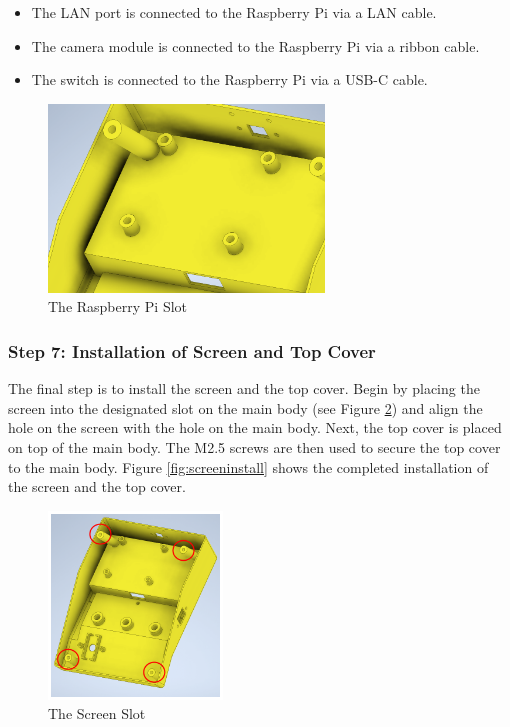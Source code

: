 \begin{itemize}
    \item The LAN port is connected to the Raspberry Pi via a LAN cable.
    \item The camera module is connected to the Raspberry Pi via a ribbon cable.
    \item The switch is connected to the Raspberry Pi via a USB-C cable.
\end{itemize}

\begin{figure}[!ht]
    \centering
    \includegraphics[height=5cm]{texs/Part1/chapter5/image/raspislot.png}
    \caption{The Raspberry Pi Slot}
    \label{fig:raspislot}
\end{figure}

\subsubsection{Step 7: Installation of Screen and Top Cover}

The final step is to install the screen and the top cover. Begin by placing the screen into the designated slot on the main body (see Figure \ref{fig:screenslot}) and align the hole on the screen with the hole on the main body. Next, the top cover is placed on top of the main body. The M2.5 screws are then used to secure the top cover to the main body. Figure \ref{fig:screeninstall} shows the completed installation of the screen and the top cover.

\begin{figure}[!ht]
    \centering
    \includegraphics[height=5cm]{texs/Part1/chapter5/image/screenslot.png}
    \caption{The Screen Slot}
    \label{fig:screenslot}
\end{figure}

